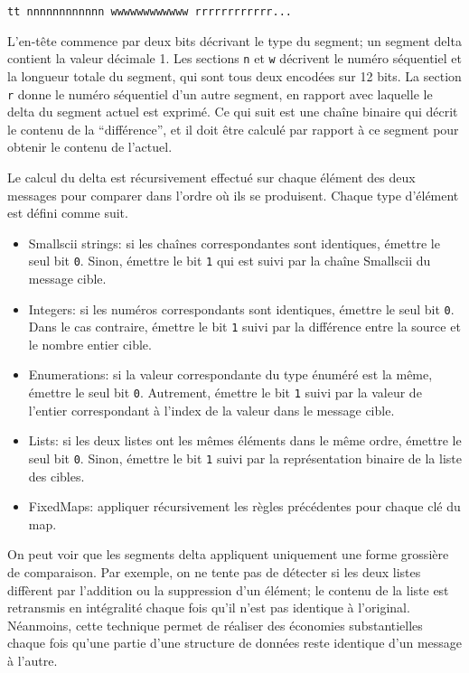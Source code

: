 \begin{verbatim}
tt nnnnnnnnnnnn wwwwwwwwwwww rrrrrrrrrrrr...
\end{verbatim}

L'en-tête commence par deux bits décrivant le type du segment; un segment delta contient la valeur décimale 1. Les sections \verb+n+ et \verb+w+ décrivent le numéro séquentiel et la longueur totale du segment, qui sont tous deux encodées sur 12 bits. La section \verb+r+ donne le numéro séquentiel d'un autre segment, en rapport avec laquelle le delta du segment actuel est exprimé. Ce qui suit est une chaîne binaire qui décrit le contenu de la ``différence'', et il doit être calculé par rapport à ce segment pour obtenir le contenu de l'actuel.

Le calcul du delta est récursivement effectué sur chaque élément des deux messages pour comparer dans l'ordre où ils se produisent. Chaque type d'élément est défini comme suit.

\begin{itemize}
\item Smallscii strings: si les chaînes correspondantes sont identiques, émettre le seul bit \verb+0+. Sinon, émettre le bit \verb+1+ qui est suivi par la chaîne Smallscii du message cible.

\item Integers: si les numéros correspondants sont identiques, émettre le seul bit \verb+0+. Dans le cas contraire, émettre le bit \verb+1+ suivi par la différence entre la source et le nombre entier cible.

\item Enumerations: si la valeur correspondante du type énuméré est la même, émettre le seul bit \verb+0+. Autrement, émettre le bit \verb+1+ suivi par la valeur de l'entier correspondant à l'index de la valeur dans le message cible.

\item Lists: si les deux listes ont les mêmes éléments dans le même ordre, émettre le seul bit \verb+0+. Sinon, émettre le bit \verb+1+ suivi par la représentation binaire de la liste des cibles.

\item FixedMaps: appliquer récursivement les règles précédentes pour chaque clé du map.
\end{itemize}

On peut voir que les segments delta appliquent uniquement une forme grossière de comparaison. Par exemple, on ne tente pas de détecter si les deux listes diffèrent par l'addition ou la suppression d'un élément; le contenu de la liste est retransmis en intégralité chaque fois qu'il n'est pas identique à l'original. Néanmoins, cette technique permet de réaliser des économies substantielles chaque fois qu'une partie d'une structure de données reste identique d'un message à l'autre.

